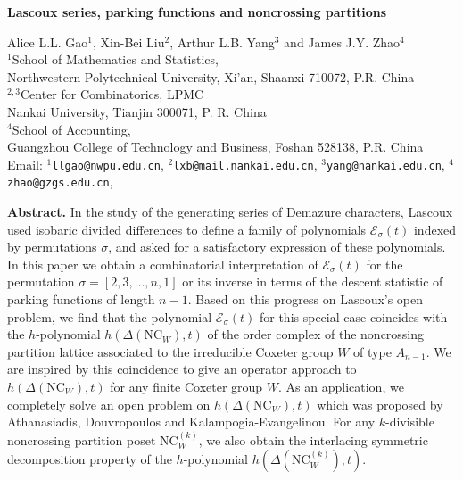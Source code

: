 \documentclass[12pt]{article}
\newcommand{\NC}{\mathrm{NC}}
\numberwithin{equation}{section}
\begin{document}
	\begin{center}
		{\large \bf Lascoux series, parking functions and noncrossing partitions}
	\end{center}
    
	\begin{center}
		Alice L.L. Gao$^1$, Xin-Bei Liu$^2$, Arthur L.B. Yang$^3$ and James J.Y. Zhao$^{4}$\\[6pt]

        $^{1}$School of Mathematics and Statistics,\\
		Northwestern Polytechnical University, Xi'an, Shaanxi 710072, P.R. China\\[6pt]
		$^{2,3}$Center for Combinatorics, LPMC\\
		Nankai University, Tianjin 300071, P. R. China\\[6pt]
		$^{4}$School of Accounting,\\
		Guangzhou College of Technology and Business,
       Foshan 528138, P.R. China\\[6pt]
		
		Email: $^{1}${\tt llgao@nwpu.edu.cn},
			   $^{2}${\tt lxb@mail.nankai.edu.cn},
               $^{3}${\tt yang@nankai.edu.cn},
               $^{4}${\tt zhao@gzgs.edu.cn},
		\end{center}
	\noindent\textbf{Abstract.}
    In the study of the generating series of Demazure characters,
    Lascoux used isobaric divided differences to define a family of polynomials $\mathcal{E}_{\sigma}(t)$ indexed by permutations $\sigma$, and asked for a satisfactory expression of these polynomials. In this paper we obtain a combinatorial interpretation of $\mathcal{E}_{\sigma}(t)$ for the permutation $\sigma=[2,3,\ldots,n,1]$ or its inverse in terms of the descent statistic of parking functions of length $n-1$. Based on this progress on Lascoux's open problem, we find that the polynomial $\mathcal{E}_{\sigma}(t)$ for this special case  coincides with 
    the $h$-polynomial $h(\Delta(\NC_W),t)$ of the order complex of the noncrossing partition lattice associated to the irreducible Coxeter group $W$ of type $A_{n-1}$. We are inspired by this coincidence to give an operator approach to $h(\Delta(\NC_W),t)$ for any finite Coxeter group $W$. As an application, we 
    completely solve an open problem on 
    $h(\Delta(\NC_W),t)$ which was proposed by  Athanasiadis, Douvropoulos and Kalampogia-Evangelinou. 
    For any $k$-divisible noncrossing partition poset $\NC^{(k)}_W$, we also obtain the interlacing symmetric decomposition property of the $h$-polynomial $h(\Delta(\NC^{(k)}_W),t)$.
\end{document}
